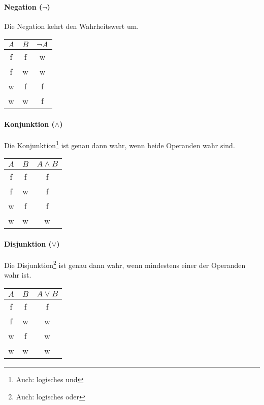 \documentclass[../main.tex]{subfiles}
\begin{document}
        \paragraph{Negation ($\neg$)}
            Die Negation kehrt den Wahrheitswert um.
            
            \begin{center}
                \begin{tabular}{ | c | c | c | }
                    \hline
                    $A$ & $B$  & $\neg A$ \\\hline
                    f & f & w \\
                    f & w & w \\
                    w & f & f \\
                    w & w & f \\\hline
                \end{tabular}
            \end{center}
            
        \paragraph{Konjunktion ($\wedge$)}
            Die Konjunktion\footnote{Auch: logisches und} ist genau dann wahr, wenn beide Operanden wahr sind.
            
            \begin{center}
                \begin{tabular}{ | c | c | c | }
                    \hline
                    $A$ & $B$  & $A \wedge B$ \\\hline
                    f & f & f \\
                    f & w & f \\
                    w & f & f \\
                    w & w & w \\\hline
                \end{tabular}
            \end{center}
            
        \paragraph{Disjunktion ($\vee$)}
            Die Disjunktion\footnote{Auch: logisches oder} ist genau dann wahr, wenn mindestens einer der Operanden wahr ist.
            
            \begin{center}
                \begin{tabular}{ | c | c | c | }
                    \hline
                    $A$ & $B$  & $A \vee B$ \\\hline
                    f & f & f \\
                    f & w & w \\
                    w & f & w \\
                    w & w & w \\\hline
                \end{tabular}
            \end{center}
            
\end{document}
